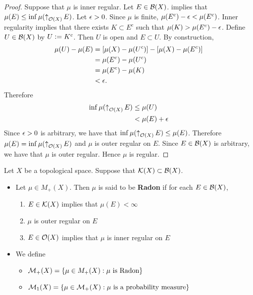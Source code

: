 \documentclass{book}
\begin{document}
	\begin{proof}
		Suppose that $\mu$ is inner regular. Let $E \in \mathcal{B}(X)$.  implies that $\mu(E) \leq \inf \mu(\operatorname{\uparrow}_{\mathcal{O}(X)} E)$. Let $\epsilon > 0$. Since $\mu$ is finite, $\mu(E^c) -\epsilon < \mu(E^c)$. Inner regularity implies that there exists $K \subset E^c$ such that $\mu(K) > \mu(E^c) - \epsilon$. Define $U \in \mathcal{B}(X)$ by $U \vcentcolon= K^c$. Then $U$ is open and $E \subset U$. By construction,
		\begin{align*}
			\mu(U) - \mu(E) 
			& = [\mu(X) - \mu(U^c)] - [\mu(X) - \mu(E^c)] \\
			& = \mu(E^c) - \mu(U^c) \\
			& = \mu(E^c) - \mu(K) \\
			& < \epsilon.
		\end{align*}
		Therefore
		\begin{align*}
			\inf \mu(\operatorname{\uparrow}_{\mathcal{O}(X)} E)
			& \leq \mu(U) \\
			& < \mu(E) + \epsilon 
		\end{align*}
		Since $\epsilon > 0$ is arbitrary, we have that $\inf \mu(\operatorname{\uparrow}_{\mathcal{O}(X)} E) \leq \mu(E)$. Therefore $\mu(E) = \inf \mu(\operatorname{\uparrow}_{\mathcal{O}(X)} E)$ and $\mu$ is outer regular on $E$. Since $E \in \mathcal{B}(X)$ is arbitrary, we have that $\mu$ is outer regular. Hence $\mu$ is regular.
	\end{proof}

	\begin{defn}  
	Let $X$ be a topological space. Suppose that $\mathcal{K}(X) \subset \mathcal{B}(X)$.
	\begin{itemize}
		\item Let $\mu \in M_+(X)$. Then $\mu$ is said to be \textbf{Radon} if for each $E \in \mathcal{B}(X)$, 
		\begin{enumerate}
			\item $E \in \mathcal{K}(X)$ implies that $\mu(E) < \infty$
			\item $\mu$ is outer regular on $E$
			\item $E \in \mathcal{O}(X)$ implies that $\mu$ is inner regular on $E$
		\end{enumerate}
		\item We define 
		\begin{itemize}
			\item $\mathcal{M}_+(X) = \{\mu \in M_+(X): \mu \text{ is Radon}\}$
			\item $\mathcal{M}_1(X) = \{\mu \in \mathcal{M}_+(X) : \mu \text{ is a probability measure}\}$
		\end{itemize}
	\end{itemize}
	\end{defn}
	
\end{document}
